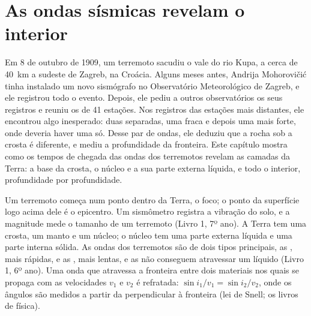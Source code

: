\chapter{As ondas sísmicas revelam o interior}\label{ch:g11:seismic-structure}

Em 8 de outubro de 1909, um terremoto sacudiu o vale do rio Kupa, a cerca de
\qty{40}{km} a sudeste de Zagreb, na Croácia. Alguns meses antes, Andrija
Mohorovičić tinha instalado um novo sismógrafo no Observatório Meteorológico
de Zagreb, e ele registrou todo o evento. Depois, ele pediu a outros
observatórios os seus registros e reuniu os de 41 estações. Nos registros
das estações mais distantes, ele encontrou algo inesperado: duas 
separadas, uma fraca e depois uma mais forte, onde deveria haver uma só.
Desse par de ondas, ele deduziu que a rocha sob a crosta é diferente, e mediu
a profundidade da fronteira. Este capítulo mostra como os tempos de chegada
das ondas dos terremotos revelam as camadas da Terra: a base da crosta, o
núcleo e a sua parte externa líquida, e todo o interior, profundidade por
profundidade.

\begin{recall}
Um terremoto começa num ponto dentro da Terra, o foco; o ponto da superfície
logo acima dele é o epicentro. Um sismômetro registra a vibração do solo, e
a magnitude mede o tamanho de um terremoto (Livro 1, 7º ano). A Terra tem
uma crosta, um manto e um núcleo; o núcleo tem uma parte externa líquida e
uma parte interna sólida. As ondas dos terremotos são de dois tipos
principais, as , mais rápidas, e as , mais lentas, e as  não conseguem atravessar um líquido (Livro 1, 6º ano). Uma onda que
atravessa a fronteira entre dois materiais nos quais se propaga com as
velocidades $v_1$ e $v_2$ é refratada:
$\sin i_1/v_1 = \sin i_2/v_2$, onde os ângulos são medidos a partir da
perpendicular à fronteira (lei de Snell; os livros de física).
\end{recall}

